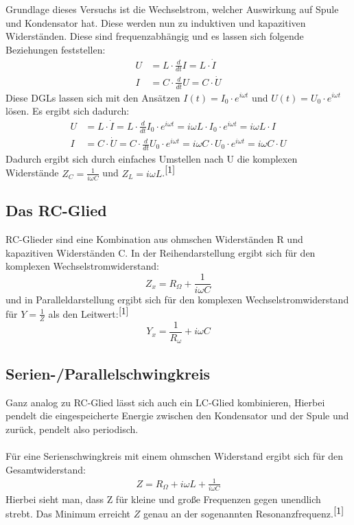\documentclass[fontsize=12pt]{scrartcl}
\begin{document}
Grundlage dieses Versuchs ist die Wechselstrom, welcher Auswirkung auf Spule und Kondensator hat. Diese werden nun zu induktiven und kapazitiven Widerständen. Diese sind frequenzabhängig und es lassen sich folgende Beziehungen feststellen: 
\begin{align*}
 U &= L \cdot \frac{d}{dt} I = L \cdot \dot{I} \\
 I &= C \cdot \frac{d}{dt} U = C \cdot \dot{U}
\end{align*}
\noindent
Diese DGLs lassen sich mit den Ansätzen $I(t)=I_0 \cdot e^{i\omega t}$ und $U(t) = U_0 \cdot e^{i\omega t}$ lösen. Es ergibt sich dadurch:
\begin{align*}
U &= L \cdot \dot{I} = L \cdot \frac{d}{dt}{I_0 \cdot e^{i\omega t} } = i\omega L \cdot I_0 \cdot e^{i\omega t} =  i\omega L \cdot I  \\
 I &= C \cdot \dot{U} = C \cdot \frac{d}{dt} U_0 \cdot e^{i\omega t} = i\omega  C \cdot U_0 \cdot e^{i\omega t} =  i\omega  C \cdot U
\end{align*}
\noindent
Dadurch ergibt sich durch einfaches Umstellen nach U die komplexen Widerstände $Z_C = \frac{1}{i\omega C}$ und $Z_L= i \omega L$.$^{\cite{1}}$

\subsection{Das RC-Glied}

RC-Glieder sind eine Kombination aus ohmschen Widerständen R und kapazitiven Widerständen C. In der Reihendarstellung ergibt sich für den komplexen Wechselstromwiderstand: 
\begin{equation*}
Z_x = R_{\Omega} + \frac{1}{i\omega C}
\end{equation*}
und in Paralleldarstellung ergibt sich für den komplexen Wechselstromwiderstand für $Y=\frac{1}{Z}$ als den Leitwert:$^{\cite{1}}$
\begin{equation*}
Y_x = \frac{1}{R_{\omega}} + i\omega C
\end{equation*}

\newpage
\subsection{Serien-/Parallelschwingkreis}

Ganz analog zu RC-Glied lässt sich auch ein LC-Glied kombinieren, Hierbei \glqq pendelt \grqq   die eingespeicherte Energie zwischen den Kondensator und der Spule und zurück, pendelt also periodisch. \\
~\\
Für eine Serienschwingkreis mit einem ohmschen Widerstand ergibt sich für den Gesamtwiderstand:
\begin{align*}
Z= R_{\Omega} + i\omega L + \frac{1}{i\omega C}
\end{align*}
Hierbei sieht man, dass Z für kleine und große Frequenzen gegen unendlich strebt. Das Minimum erreicht $Z$ genau an der sogenannten Resonanzfrequenz.$^{\cite{1}}$
\end{document}
